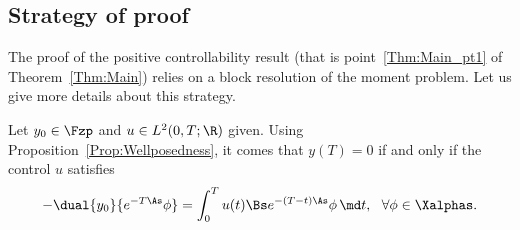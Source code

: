 \subsection{Strategy of proof} \label{Subsec:Strategy}


The proof of the positive controllability result (that is point~\eqref{Thm:Main_pt1} of Theorem~\ref{Thm:Main}) relies on a block resolution of the moment problem. Let us give more details about this strategy.

Let $y_0\in \Fzp$ and $u\in L^2(0,T;\R)$ given. Using Proposition~\ref{Prop:Wellposedness}, it comes that $y(T)=0$ if and only if the control $u$ satisfies
\begin{equation}\label{premiere_equation_dualite}
- \dual{y_0}{e^{-T \As} \phi} = \int_0^T u(t) \Bs e^{-(T-t) \As} \phi\, \md t, \ \ \forall \phi\in \Xalphas.
\end{equation}

